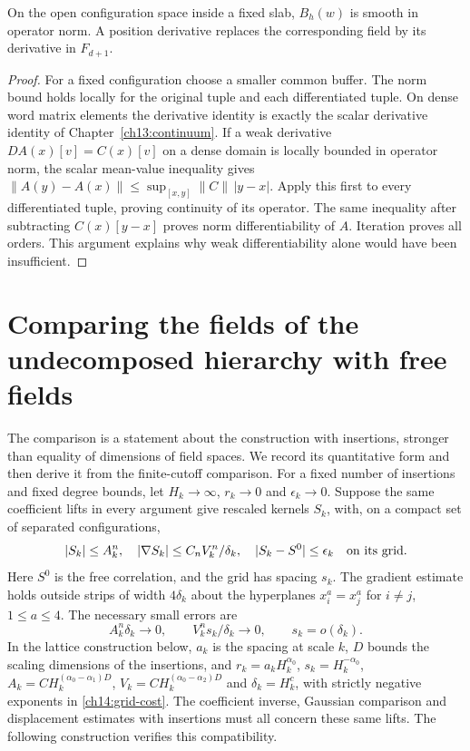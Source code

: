 \begin{proposition}
\label{ch14:slab-smooth}
On the open configuration space inside a fixed slab, $B_h(w)$ is
smooth in operator norm. A position derivative replaces the
corresponding field by its derivative in $F_{d+1}$.
\end{proposition}

\begin{proof}
For a fixed configuration choose a smaller common buffer. The norm
bound holds locally for the original tuple and each differentiated
tuple. On dense word matrix elements the derivative identity is
exactly the scalar derivative identity of Chapter~\ref{ch13:continuum}.
If a weak derivative $D A(x)[v]=C(x)[v]$ on a dense domain is locally
bounded in operator norm, the scalar mean-value inequality gives
$\|A(y)-A(x)\|\le\sup_{[x,y]}\|C\|\,|y-x|$.
Apply this first to every differentiated tuple, proving continuity
of its operator. The same inequality after subtracting
$C(x)[y-x]$ proves norm differentiability of $A$. Iteration proves
all orders. This argument explains why weak differentiability alone
would have been insufficient.
\end{proof}

\section{Comparing the fields of the undecomposed hierarchy with free fields}
\label{ch14:comparison}

The comparison is a statement about the construction with insertions,
stronger than equality of dimensions of field spaces. We record its
quantitative form and then derive it from the finite-cutoff comparison. For a fixed number of insertions and fixed degree bounds,
let $H_k\to\infty$, $r_k\to0$ and $\epsilon_k\to0$. Suppose the
same coefficient lifts in every argument give rescaled kernels $S_k$,
with, on a compact set of separated configurations,
\begin{equation}\label{ch14:grid-input}
 |S_k|\le A_k^n,\quad
 |\nabla S_k|\le C_n V_k^n/\delta_k,
 \quad |S_k-S^0|\le\epsilon_k\quad\hbox{on its grid}.
\end{equation}
Here $S^0$ is the free correlation, and the grid has spacing $s_k$.
The gradient estimate holds outside strips of width $4\delta_k$ about
the hyperplanes $x_i^a=x_j^a$ for $i\ne j$, $1\le a\le4$. The necessary small errors are
\begin{equation}\label{ch14:grid-cost}
 A_k^n\delta_k\to0,\qquad V_k^n s_k/\delta_k\to0,
 \qquad s_k=o(\delta_k).
\end{equation}
In the lattice construction below, $a_k$ is the spacing at scale $k$,
$D$ bounds the scaling dimensions of the insertions, and
$r_k=a_kH_k^{\alpha_0}$, $s_k=H_k^{-\alpha_0}$,
$A_k=CH_k^{(\alpha_0-\alpha_1)D}$,
$V_k=CH_k^{(\alpha_0-\alpha_2)D}$ and $\delta_k=H_k^c$,
with strictly negative exponents in \eqref{ch14:grid-cost}.
The coefficient inverse, Gaussian comparison and displacement
estimates with insertions must all concern these same lifts. The following construction verifies this compatibility.

